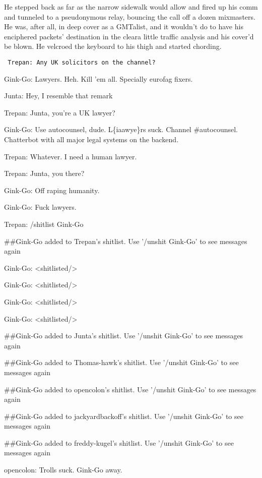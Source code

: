 He stepped back as far as the narrow sidewalk would allow and fired
up his comm and tunneled to a pseudonymous relay, bouncing the call
off a dozen mixmasters. He was, after all, in deep cover as a
GMTalist, and it wouldn’t do to have his enciphered packets’
destination in the clear{\dash}a little traffic analysis and his cover’d
be blown. He velcroed the keyboard to his thigh and started
chording.

{\raggedright
\tt
\addtolength{\parskip}{0.5\baselineskip}
Trepan: Any UK solicitors on the channel?

Gink-Go: Lawyers. Heh. Kill 'em all. Specially eurofag fixers.

Junta: Hey, I resemble that remark

Trepan: Junta, you're a UK lawyer?

Gink-Go: Use autocounsel, dude. L\{ia\textbar{}awye\}rs suck.
Channel \#autocounsel. Chatterbot with all major legal systems on
the backend.

Trepan: Whatever. I need a human lawyer.

Trepan: Junta, you there?

Gink-Go: Off raping humanity.

Gink-Go: Fuck lawyers.

Trepan: /shitlist Gink-Go

\#\#Gink-Go added to Trepan's shitlist. Use '/unshit Gink-Go' to
see messages again

Gink-Go: \textless{}shitlisted/\textgreater{}

Gink-Go: \textless{}shitlisted/\textgreater{}

Gink-Go: \textless{}shitlisted/\textgreater{}

Gink-Go: \textless{}shitlisted/\textgreater{}

\#\#Gink-Go added to Junta's shitlist. Use '/unshit Gink-Go' to see
messages again

\#\#Gink-Go added to Thomas-hawk's shitlist. Use '/unshit Gink-Go'
to see messages again

\#\#Gink-Go added to opencolon's shitlist. Use '/unshit Gink-Go' to
see messages again

\#\#Gink-Go added to jackyardbackoff's shitlist. Use '/unshit
Gink-Go' to see messages again

\#\#Gink-Go added to freddy-kugel's shitlist. Use '/unshit Gink-Go'
to see messages again

opencolon: Trolls suck. Gink-Go away.

}
